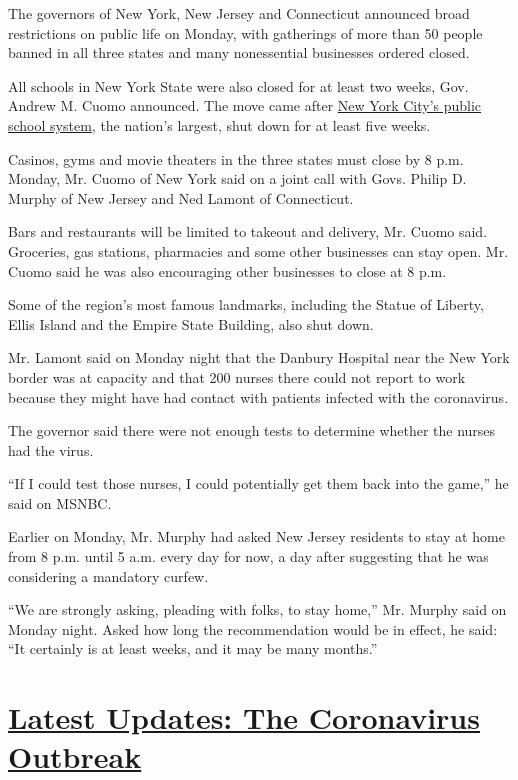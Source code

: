The governors of New York, New Jersey and Connecticut announced broad
restrictions on public life on Monday, with gatherings of more than 50
people banned in all three states and many nonessential businesses
ordered closed.

All schools in New York State were also closed for at least two weeks,
Gov. Andrew M. Cuomo announced. The move came after
\href{https://www.nytimes.com/2020/03/16/nyregion/nyc-schools-closed-coronavirus.html}{New
York City's public school system}, the nation's largest, shut down for
at least five weeks.

Casinos, gyms and movie theaters in the three states must close by 8
p.m. Monday, Mr. Cuomo of New York said on a joint call with Govs.
Philip D. Murphy of New Jersey and Ned Lamont of Connecticut.

Bars and restaurants will be limited to takeout and delivery, Mr. Cuomo
said. Groceries, gas stations, pharmacies and some other businesses can
stay open. Mr. Cuomo said he was also encouraging other businesses to
close at 8 p.m.

Some of the region's most famous landmarks, including the Statue of
Liberty, Ellis Island and the Empire State Building, also shut down.

Mr. Lamont said on Monday night that the Danbury Hospital near the New
York border was at capacity and that 200 nurses there could not report
to work because they might have had contact with patients infected with
the coronavirus.

The governor said there were not enough tests to determine whether the
nurses had the virus.

``If I could test those nurses, I could potentially get them back into
the game,'' he said on MSNBC.

Earlier on Monday, Mr. Murphy had asked New Jersey residents to stay at
home from 8 p.m. until 5 a.m. every day for now, a day after suggesting
that he was considering a mandatory curfew.

``We are strongly asking, pleading with folks, to stay home,'' Mr.
Murphy said on Monday night. Asked how long the recommendation would be
in effect, he said: ``It certainly is at least weeks, and it may be many
months.''

\hypertarget{latest-updates-the-coronavirus-outbreak}{%
\section{\texorpdfstring{\href{https://www.nytimes.com/2020/08/17/world/coronavirus-covid.html?action=click\&pgtype=Article\&state=default\&region=MAIN_CONTENT_1\&context=storylines_live_updates}{Latest
Updates: The Coronavirus
Outbreak}}{Latest Updates: The Coronavirus Outbreak}}\label{latest-updates-the-coronavirus-outbreak}}


